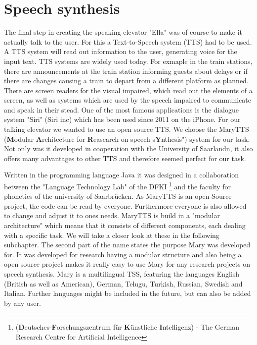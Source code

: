 \documentclass[a4paper, 12pt]{article}
\begin{document}
\newpage        
\section{Speech synthesis}
The final step in creating the speaking elevator "Ella" was of course to make it actually talk to the user.
For this a Text-to-Speech system (TTS) had to be used. A TTS system will read out information to the user, generating voice for the input text. TTS systems are widely used today. 
For exmaple in the train stations, there are announcements at the train station informing guests about delays or if there are changes causing a train to depart from a different platform as planned.
There are screen readers for the visual impaired, which read out the elements of a screen, as well as systems which are used by the speech impaired to communicate and speak in their stead.
One of the most famous applications is the dialogue system "Siri" (Siri inc) which has been used since 2011 on the iPhone. \newline \newline
For our talking elevator we wanted to use an open source TTS. 
We choose the MaryTTS (\textbf{M}odular \textbf{A}rchitecture for \textbf{R}easearch on speech s\textbf{Y}nthesis") system for our task.
Not only was it developed in cooperation with the University of Saarlandn, it also offers many advantages to other TTS and therefore seemed perfect for our task.\newline

Written in the programming language Java it was designed in a collaboration between the  "Language Technology Lab" of the DFKI \footnote{(\textbf{D}eutsches-\textbf{F}orschungszentrum für \textbf{K}ünstliche \textbf{I}ntelligenz) - The German Research Centre for Artificial Intelligence} and the faculty for phonetics of the university of Saarbrücken.
As MaryTTS is an open Source project, the code can be read by everyone. Furthermore everyone is also allowed to change and adjust it to ones needs.\newline \newline
MaryTTS is build in a "modular architecture" which means that it consists of different components, each dealing with a specific task. We will take a closer look at these in the following subchapter.
The second part of the name states the purpose Mary was developed for.
It was developed for research having a modular structure and also being a open source project makes it really easy to use Mary for any research projects on speech synthesis. \newline \newline
Mary is a multilingual TSS, featuring the languages English (British as well as American), German, Telugu, Turkish, Russian, Swedish and Italian. 
Further languages might be included in the future, but can also be added by any user. \newline \newline
\end{document}
